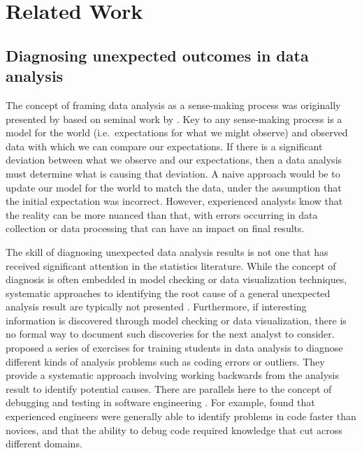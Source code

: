 \documentclass[
  12pt,
]{interact}
\begin{document}
\section{Related Work}\label{sec-lit-review}

\subsection{Diagnosing unexpected outcomes in data
analysis}\label{diagnosing-unexpected-outcomes-in-data-analysis}

The concept of framing data analysis as a sense-making process was
originally presented by \citet{grolemund_cognitive_2014} based on
seminal work by \citet{wild1999statistical}. Key to any sense-making
process is a model for the world (i.e.~expectations for what we might
observe) and observed data with which we can compare our expectations.
If there is a significant deviation between what we observe and our
expectations, then a data analysis must determine what is causing that
deviation. A naive approach would be to update our model for the world
to match the data, under the assumption that the initial expectation was
incorrect. However, experienced analysts know that the reality can be
more nuanced than that, with errors occurring in data collection or data
processing that can have an impact on final results.

The skill of diagnosing unexpected data analysis results is not one that
has received significant attention in the statistics literature. While
the concept of diagnosis is often embedded in model checking or data
visualization techniques, systematic approaches to identifying the root
cause of a general unexpected analysis result are typically not
presented \citep{peng2022perspective}. Furthermore, if interesting
information is discovered through model checking or data visualization,
there is no formal way to document such discoveries for the next analyst
to consider. \citet{peng_diagnosing_2021} proposed a series of exercises
for training students in data analysis to diagnose different kinds of
analysis problems such as coding errors or outliers. They provide a
systematic approach involving working backwards from the analysis result
to identify potential causes. There are parallels here to the concept of
debugging and testing in software engineering
\citep{donoghue2021teaching}. For example, \citet{li2019towards} found
that experienced engineers were generally able to identify problems in
code faster than novices, and that the ability to debug code required
knowledge that cut across different domains.
\end{document}
